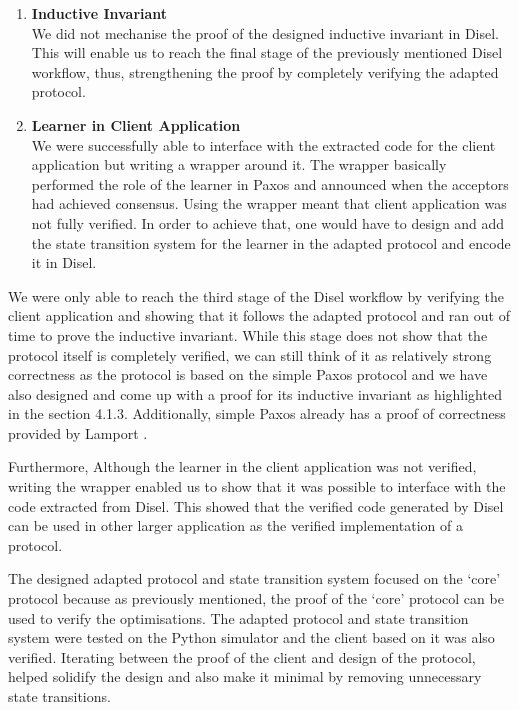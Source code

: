 \begin{enumerate}
  \item \textbf{Inductive Invariant} \\
    We did not mechanise the proof of the designed inductive invariant in Disel.
    This will enable us to reach the final stage of the previously mentioned Disel workflow,
    thus, strengthening the proof by completely verifying the adapted protocol.
  \item \textbf{Learner in Client Application} \\
    We were successfully able to interface with the extracted code for the client
    application but writing a wrapper around it. The wrapper basically performed
    the role of the learner in Paxos and announced when the acceptors had
    achieved consensus. Using the wrapper meant that client application was not
    fully verified. In order to achieve that, one would have to design and add the
    state transition system for the learner in the adapted protocol and encode it
    in Disel.
\end{enumerate}

We were only able to reach the third stage of the Disel workflow by
verifying the client application and showing that it follows the
adapted protocol and ran out of time to prove the inductive invariant.
While this stage does not show that the protocol itself
is completely verified, we can still think of it as relatively strong
correctness as the protocol is based on the simple Paxos protocol and
we have also designed and come up with a proof for its inductive invariant
as highlighted in the section 4.1.3. Additionally, simple Paxos already has
a proof of correctness provided by Lamport \cite{4}.

Furthermore, Although the learner in the client application was not verified,
writing the
wrapper enabled us to show that it was possible to interface with the code
extracted from Disel. This showed that the verified code generated by Disel
can be used in other larger application as the verified implementation of
a protocol.

The designed adapted protocol and state transition system focused on
the `core' protocol because as previously mentioned, the proof of the `core'
protocol can be used to verify the optimisations. The adapted protocol and
state transition system were tested on the Python simulator and the client
based on it was also verified. Iterating between the proof of the client
and design of the protocol, helped solidify the design and also make it
minimal by removing unnecessary state transitions.

